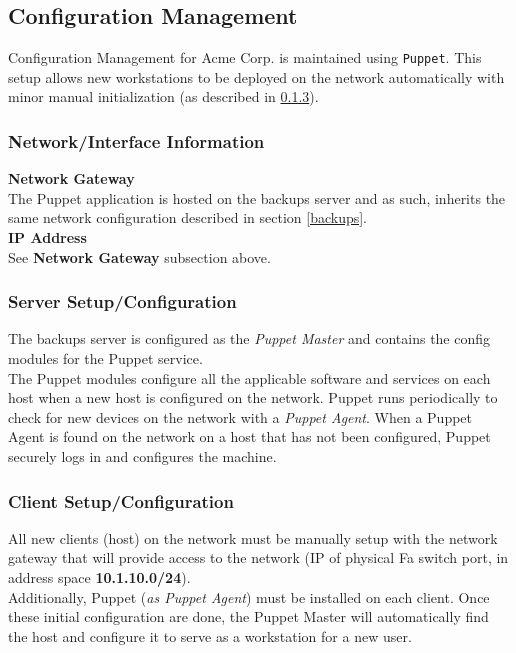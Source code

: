 \subsection{Configuration Management}
Configuration Management for Acme Corp. is maintained using \lstinline$Puppet$. 
This setup allows new workstations to be deployed on the network automatically
with minor manual initialization (as described in \ref{puppet-client}).

\subsubsection{Network/Interface Information}
\textbf{Network Gateway} \\
The Puppet application is hosted on the backups server and as such, inherits 
the same network configuration described in section \ref{backups}. \\

\noindent
\textbf{IP Address} \\
See \textbf{Network Gateway} subsection above.

\subsubsection{Server Setup/Configuration}
The backups server is configured as the \textit{Puppet Master} and contains 
the config modules for the Puppet service. \\

\noindent
The Puppet modules configure all the applicable software and services on each 
host when a new host is configured on the network. Puppet runs periodically to 
check for new devices on the network with a \textit{Puppet Agent}. When a 
Puppet Agent is found on the network on a host that has not been configured,
Puppet securely logs in and configures the machine. \\

\subsubsection{Client Setup/Configuration} \label{puppet-client}
All new clients (host) on the network must be manually setup with the network 
gateway that will provide access to the network (IP of physical Fa switch 
port, in address space \textbf{10.1.10.0/24}). \\

\noindent
Additionally, Puppet (\textit{as Puppet Agent}) must be installed on each 
client. Once these initial configuration are done, the Puppet Master will 
automatically find the host and configure it to serve as a workstation for a 
new user. \\
